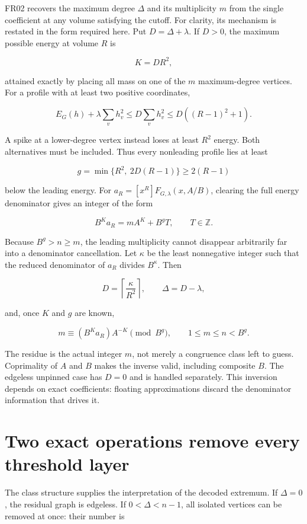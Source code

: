 \documentclass[
  11pt,
  a4paper,
]{report}
\begin{document}
FR02 recovers the maximum degree \(\Delta\) and its multiplicity \(m\)
from the single coefficient at any volume satisfying the cutoff. For
clarity, its mechanism is restated in the form required here. Put
\(D=\Delta+\lambda\). If \(D>0\), the maximum possible energy at volume
\(R\) is

\[
 K=D R^2,
\]

attained exactly by placing all mass on one of the \(m\) maximum-degree
vertices. For a profile with at least two positive coordinates,

\[
 E_G(h)+\lambda\sum_vh_v^2
 \le D\sum_vh_v^2
 \le D((R-1)^2+1).
\]

A spike at a lower-degree vertex instead loses at least \(R^2\) energy.
Both alternatives must be included. Thus every nonleading profile lies
at least

\[
 g=\min\{R^2,\ 2D(R-1)\}\ge2(R-1)
\]

below the leading energy. For \(a_R=[x^R]F_{G,\lambda}(x,A/B)\),
clearing the full energy denominator gives an integer of the form

\[
 B^K a_R=mA^K+B^g T,\qquad T\in\mathbb Z.
\]

Because \(B^g>n\ge m\), the leading multiplicity cannot disappear
arbitrarily far into a denominator cancellation. Let \(\kappa\) be the
least nonnegative integer such that the reduced denominator of \(a_R\)
divides \(B^\kappa\). Then

\[
 D=\left\lceil\frac\kappa{R^2}\right\rceil,
 \qquad \Delta=D-\lambda,
\]

and, once \(K\) and \(g\) are known,

\[
 m\equiv (B^Ka_R)A^{-K}\pmod{B^g},\qquad 1\le m\le n<B^g.
\]

The residue is the actual integer \(m\), not merely a congruence class
left to guess. Coprimality of \(A\) and \(B\) makes the inverse valid,
including composite \(B\). The edgeless unpinned case has \(D=0\) and is
handled separately. This inversion depends on exact coefficients:
floating approximations discard the denominator information that drives
it.

\hypertarget{two-exact-operations-remove-every-threshold-layer}{%
\section{Two exact operations remove every threshold
layer}\label{two-exact-operations-remove-every-threshold-layer}}

The class structure supplies the interpretation of the decoded extremum.
If \(\Delta=0\), the residual graph is edgeless. If \(0<\Delta<n-1\),
all isolated vertices can be removed at once: their number is
\end{document}
